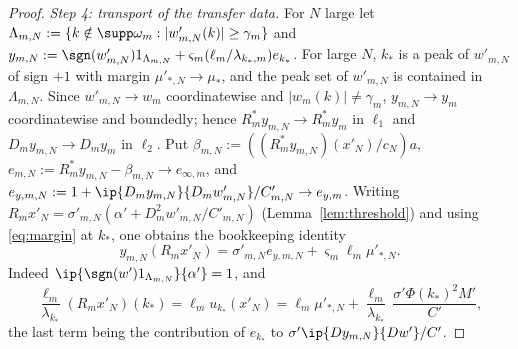 \begin{proof}
\emph{Step 4: transport of the transfer data.}  For $N$ large let
$\Lambda_{m,N}:=\{k\notin\supp\omega_m:|w'_{m,N}(k)|\ge\gamma_m\}$ and
$y_{m,N}:=\sgn(w'_{m,N})1_{\Lambda_{m,N}}+\varsigma_m(\ell_m/\lambda_{k_*,m})
e_{k_*}$.  For large $N$, $k_*$ is a peak of $w'_{m,N}$ of sign $+1$ with
margin $\mu'_{*,N}\to\mu_*$, and the peak set of $w'_{m,N}$ is contained
in $\Lambda_{m,N}$.  Since $w'_{m,N}\to w_m$ coordinatewise and
$|w_m(k)|\ne\gamma_m$, $y_{m,N}\to y_m$ coordinatewise and boundedly; hence
$R_m^*y_{m,N}\to R_m^*y_m$ in $\ell_1$ and $D_my_{m,N}\to D_my_m$ in
$\ell_2$.  Put $\beta_{m,N}:=((R_m^*y_{m,N})(x'_N)/c_N)a$,
$e_{m,N}:=R_m^*y_{m,N}-\beta_{m,N}\to e_{\infty,m}$, and
$e_{y,m,N}:=1+\ip{D_my_{m,N}}{D_mw'_{m,N}}/C'_{m,N}\to e_{y,m}$.  Writing
$R_mx'_N=\sigma'_{m,N}(\alpha'+D_m^2w'_{m,N}/C'_{m,N})$
(Lemma~\ref{lem:threshold}) and using \eqref{eq:margin} at $k_*$, one obtains
the bookkeeping identity
\begin{equation}\label{eq:bookkeeping}
 y_{m,N}(R_mx'_N)=\sigma'_{m,N}e_{y,m,N}+\varsigma_m\ell_m\mu'_{*,N}.
\end{equation}
Indeed $\ip{\sgn(w')1_{\Lambda_{m,N}}}{\alpha'}=1$, and
\[
 \frac{\ell_m}{\lambda_{k_*}}(R_mx'_N)(k_*)=\ell_mu_{k_*}(x'_N)=
 \ell_m\mu'_{*,N}+\frac{\ell_m}{\lambda_{k_*}}\,\frac{\sigma'\Phi(k_*)^2M'}{C'},
\]
the last term being the contribution of $e_{k_*}$ to
$\sigma'\ip{D y_{m,N}}{Dw'}/C'$.


\end{proof}
